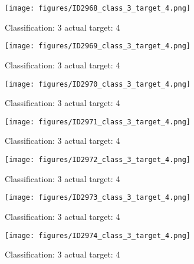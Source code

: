 \begin{figure}[h!]
\begin{center}
\texttt{[image: figures/ID2968\_class\_3\_target\_4.png]}
\end{center}
\caption{ Classification: 3 actual target: 4}
\label{fig:ID2968_class_3_target_4}
\end{figure}
\begin{figure}[h!]
\begin{center}
\texttt{[image: figures/ID2969\_class\_3\_target\_4.png]}
\end{center}
\caption{ Classification: 3 actual target: 4}
\label{fig:ID2969_class_3_target_4}
\end{figure}
\begin{figure}[h!]
\begin{center}
\texttt{[image: figures/ID2970\_class\_3\_target\_4.png]}
\end{center}
\caption{ Classification: 3 actual target: 4}
\label{fig:ID2970_class_3_target_4}
\end{figure}
\begin{figure}[h!]
\begin{center}
\texttt{[image: figures/ID2971\_class\_3\_target\_4.png]}
\end{center}
\caption{ Classification: 3 actual target: 4}
\label{fig:ID2971_class_3_target_4}
\end{figure}
\begin{figure}[h!]
\begin{center}
\texttt{[image: figures/ID2972\_class\_3\_target\_4.png]}
\end{center}
\caption{ Classification: 3 actual target: 4}
\label{fig:ID2972_class_3_target_4}
\end{figure}
\begin{figure}[h!]
\begin{center}
\texttt{[image: figures/ID2973\_class\_3\_target\_4.png]}
\end{center}
\caption{ Classification: 3 actual target: 4}
\label{fig:ID2973_class_3_target_4}
\end{figure}
\begin{figure}[h!]
\begin{center}
\texttt{[image: figures/ID2974\_class\_3\_target\_4.png]}
\end{center}
\caption{ Classification: 3 actual target: 4}
\label{fig:ID2974_class_3_target_4}
\end{figure}
